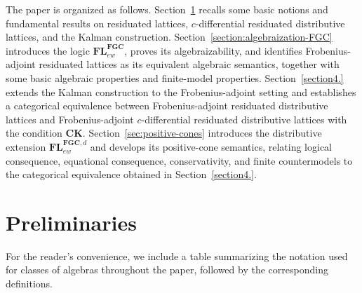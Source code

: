 \documentclass[final,12pt,times]{elsarticle}
\theoremstyle{plain}
\theoremstyle{definition}
\theoremstyle{break}
\begin{document}
The paper is organized as follows. Section~\ref{section:preliminaries-RL} recalls some basic notions and fundamental results on residuated lattices, $c$-differential residuated distributive lattices, and the Kalman construction. Section~\ref{section:algebraization-FGC} introduces the logic $\mathbf{FL}^{\mathbf{FGC}}_{ew}$, proves its algebraizability, and identifies Frobenius-adjoint residuated lattices as its equivalent algebraic semantics, together with some basic algebraic properties and finite-model properties. Section~\ref{section4.} extends the Kalman construction to the Frobenius-adjoint setting and establishes a categorical equivalence between Frobenius-adjoint residuated distributive lattices and Frobenius-adjoint $c$-differential residuated distributive lattices with the condition $\mathbf{CK}$. Section~\ref{sec:positive-cones} introduces the distributive extension $\mathbf{FL}^{\mathbf{FGC},d}_{ew}$ and develops its positive-cone semantics, relating logical consequence, equational consequence, conservativity, and finite countermodels to the categorical equivalence obtained in Section~\ref{section4.}.

\section{Preliminaries}\label{section:preliminaries-RL}

For the reader's convenience, we include a table summarizing the notation used for classes of algebras throughout the paper, followed by the corresponding definitions.
\end{document}
